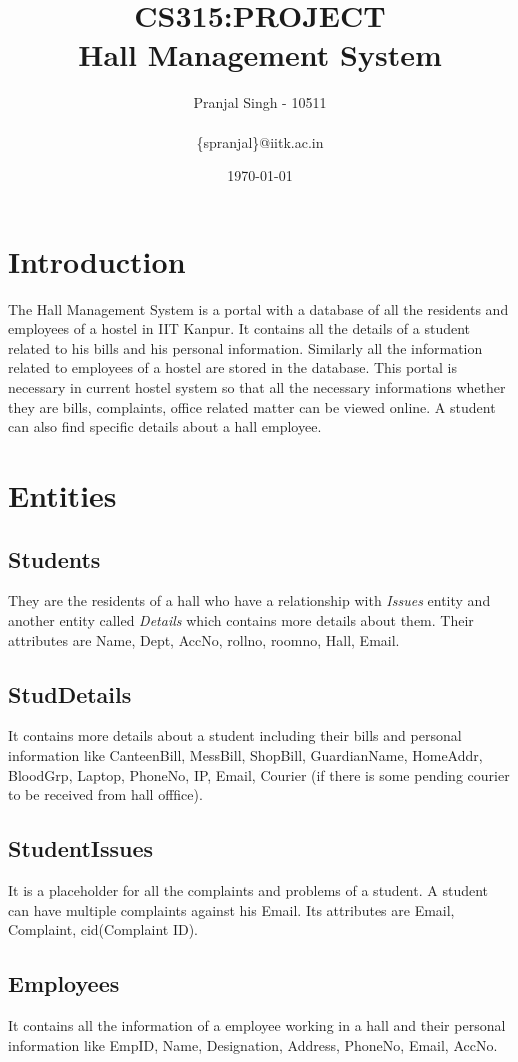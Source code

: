 \documentclass{article}
\title{\huge{CS315:PROJECT\\Hall Management System}}
\author{Pranjal Singh - 10511\\   \\ \{spranjal\}@iitk.ac.in}
\date{\today}
\begin{document}
\maketitle
\section{Introduction}
The Hall Management System is a portal with a database of all the residents and employees of a hostel in IIT Kanpur. It contains
all the details of a student related to his bills and his personal information. Similarly all the information related to employees of a hostel are stored in the database. This portal is necessary in current hostel system so that all the necessary informations whether they are bills, complaints, office related matter can be viewed online. A student can also find specific details about a hall employee.

\section{Entities}
\subsection{Students}
They are the residents of a hall who have a relationship with \emph{Issues} entity and another entity called \emph{Details} which contains more details about them. Their attributes are Name, Dept, AccNo, rollno, roomno, Hall, Email.

\subsection{StudDetails}
It contains more details about a student including their bills and personal information like CanteenBill, MessBill, ShopBill, GuardianName, HomeAddr, BloodGrp, Laptop, PhoneNo, IP, Email, Courier (if there is some pending courier to be received from hall offfice).

\subsection{StudentIssues}
It is a placeholder for all the complaints and problems of a student. A student can have multiple complaints against his Email. Its attributes are Email, Complaint, cid(Complaint ID).

\subsection{Employees}
It contains all the information of a employee working in a hall and their personal information like EmpID, Name, Designation, Address, PhoneNo, Email, AccNo.
\end{document}
